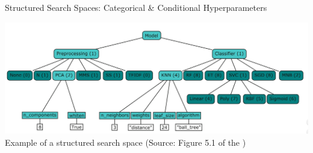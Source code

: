 \begin{frame}[c]{Structured Search Spaces: Categorical \&  Conditional Hyperparameters}
\begin{center}
    \includegraphics[width=.9\linewidth, height=0.9\textheight, keepaspectratio=true]{images/categ_cond_params/Conditional Parameters AutoML Book.png}
    \newline
    Example of a structured search space (Source: Figure 5.1 of the )
\end{center}
\end{frame}
